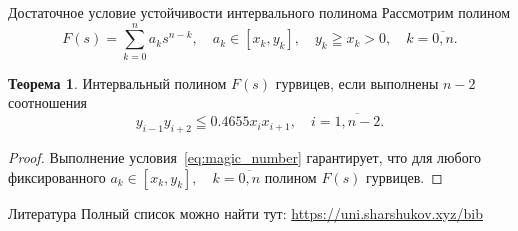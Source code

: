 \documentclass[notheorems,aspectratio=169]{beamer}
\theoremstyle{definition}
\newtheorem{theorem}{Теорема}
\begin{document}
\begin{frame}{Достаточное условие устойчивости интервального полинома}
  Рассмотрим полином
  \begin{equation}
    F(s) = \sum_{k=0}^n a_k s^{n-k}, \quad a_k \in [x_k, y_k], \quad y_k \geqq x_k > 0, \quad k = \overline{0,n}.
  \end{equation}

  \begin{theorem}
    Интервальный полином $F(s)$ гурвицев, если выполнены $n-2$ соотношения
    \begin{equation}\label{eq:magic_number}
      y_{i-1} y_{i+2} \leqq 0.4655 x_i x_{i+1}, \quad i = \overline{1,n-2}.
    \end{equation}
  \end{theorem}

  \begin{proof}
    Выполнение условия~\eqref{eq:magic_number} гарантирует, что для любого фиксированного $a_k \in [x_k, y_k], \quad k = \overline{0,n}$ полином $F(s)$ гурвицев.
  \end{proof}
\end{frame}

\begin{frame}[shrink=35]{Литература}
  \nocite{Jury1990Ru}
  \printbibliography{}
  Полный список можно найти тут: \url{https://uni.sharshukov.xyz/bib}
\end{frame}
\end{document}
